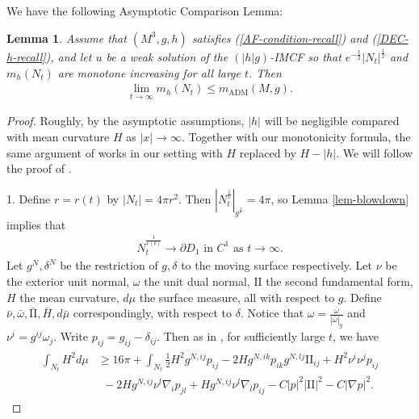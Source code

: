 \documentclass[11pt, letterpaper]{amsart}
\newtheorem{lem}[thm]{Lemma}
\theoremstyle{definition}
\theoremstyle{remark}
\begin{document}
We have the following Asymptotic Comparison Lemma:
\begin{lem}\label{lem-asymp-comp}
	Assume that $(M^3, g, h)$ satisfies (\ref{AF-condition-recall}) and (\ref{DEC-h-recall}), and let $u$ be a weak solution of the $(|h|g)$-IMCF so that $e ^{- \frac{t}{2}} |N_t| ^{\frac{1}{2}}$ and $m_{h}(N_t)$ are monotone increasing for all large $t$. Then
	\begin{align*}
		\lim_{t\to \infty} m_{h}(N_t) \leq m_{\mathrm{ADM}}(M, g). 
	\end{align*} 
\end{lem}

\begin{proof}
	Roughly, by the asymptotic assumptions, $|h|$ will be negligible compared with mean curvature $H$ as $|x| \to \infty$. Together with our monotonicity formula, the same argument of \cite{HI01} works in our setting with $H$ replaced by $H - |h|$. We will follow  the proof of \cite[Lemma 7.4]{HI01}. 

	1. Define $r = r(t)$ by $|N_t| = 4 \pi r ^2$. Then $|N_{t} ^{\frac{1}{r}}|_{g ^{\frac{1}{r}}} = 4 \pi $, so Lemma \ref{lem-blowdown} implies that 
	\begin{align}\label{Nt-rescale-conv}
		N_{t} ^{\frac{1}{r(t)}} \to \partial D_{1} \text{ in } C^{1} \text{ as } t\to \infty.
	\end{align}
	Let $g ^{N}, \delta ^{N}$ be the restriction of $g, \delta $ to the moving surface respectively. Let $\nu $ be the exterior unit normal, $\omega $ the unit dual normal, $\mathrm{II}$ the second fundamental form, $H$ the mean curvature, $d \mu $ the surface measure, all with respect to $g$. Define $\bar{\nu }, \bar{\omega }, \bar{\mathrm{II}}, \bar{H}, d \bar{\mu }$ correspondingly, with respect to $\delta $. Notice that $\omega = \frac{\bar{\omega }}{|\bar{\omega }|_{g}}$ and $\nu ^{i} = g ^{ij} \omega _j$. Write $p_{ij} = g_{ij} - \delta _{ij}$. Then as in \cite{HI01}, for sufficiently large $t$, we have
	\begin{align}\label{H2-lower-infty}
		\begin{split}
			\int_{N_t} H^2 d \mu &\geq 16 \pi + \int_{N_t} \frac{1}{2} H^2 g ^{N, ij} p_{ij} - 2 H g ^{N, ik}p_{ik} g ^{N, lj} \mathrm{II}_{ij} + H^2 \nu ^{i} \nu ^{j} p_{ij}\\
			&\ \ -2 H g ^{N, ij} \nu ^{l} \nabla _{i} p_{jl} + H g ^{N, ij} \nu ^{l} \nabla _{l} p_{ij} - C |p|^2 |\mathrm{II}|^2 - C |\nabla p|^2.
		\end{split}
	\end{align}



\end{proof}
\end{document}
